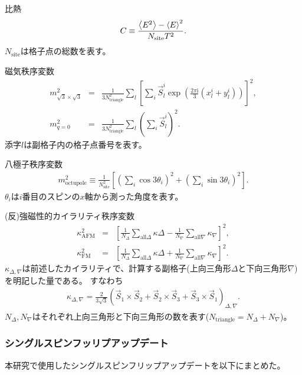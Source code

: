 \documentclass[12pt,titlepage,dvipdfmx]{jarticle}
\begin{document}
比熱
\begin{align}
   C \equiv \frac{\ev{E^2}-\ev{E}^2}{N_{\mathrm{site}}T^2}.
\end{align}
$N_{\mathrm{site}}$は格子点の総数を表す。

磁気秩序変数
\begin{eqnarray}
   m^2_{\mathrm{\sqrt3\times\sqrt3}} &=& 
   \frac{1}{3N^2_{\mathrm{triangle}}}\sum_{l}\left[\sum_{i} \vec S_l^i \exp\left( \frac{2\pi\mathrm{i}}{3}(x_l^i+y_l^i)\right)\right]^2,\\
   m^2_{q=0}                         &=& 
   \frac{1}{3N^2_{\mathrm{triangle}}}\sum_{l}\left(\sum_{i} \vec S_l^i \right)^2.
\end{eqnarray}
添字$l$は副格子内の格子点番号を表す。

八極子秩序変数
\begin{align}
   m^2_{\mathrm{octupole}} \equiv 
\frac{1}{N_{\mathrm{site}}^2}\left[ \left(\sum_i \cos 3\theta_i \right)^2+\left(\sum_i\sin 3\theta_i\right)^2\right].
\end{align}
$\theta_i$は$i$番目のスピンの$x$軸から測った角度を表す。

(反)強磁性的カイラリティ秩序変数
\begin{eqnarray}
   \kappa_{\mathrm{AFM}}^2 &=& 
   \left[ \frac{1}{N_{\Delta}}\sum_{\mathrm{all}\Delta}\kappa{\Delta} - \frac{1}{N_{\nabla}}\sum_{\mathrm{all}\nabla}\kappa_{\nabla}\right]^2,\\
   \kappa_{\mathrm{FM}}^2  &=& 
   \left[ \frac{1}{N_{\Delta}}\sum_{\mathrm{all}\Delta}\kappa{\Delta} + \frac{1}{N_{\nabla}}\sum_{\mathrm{all}\nabla}\kappa_{\nabla}\right]^2.
\end{eqnarray}
$\kappa_{\Delta,\nabla}$は前述したカイラリティで、計算する副格子(上向三角形$\Delta$と下向三角形$\nabla$)を明記した量である。
すなわち
\begin{align}
   \kappa_{\Delta,\nabla} = \frac{2}{3\sqrt{3}}(\vec S_1 \times \vec S_2 + \vec S_2 \times \vec S_3 + \vec S_3 \times \vec S_1)_{\Delta,\nabla}.
\end{align}
$N_{\Delta},N_{\nabla}$はそれぞれ上向三角形と下向三角形の数を表す($N_{\mathrm{triangle}}=N_{\Delta}+N_{\nabla}$)。

\subsubsection{シングルスピンフッリプアップデート}
本研究で使用したシングルスピンフリップアップデートを以下にまとめた。
\end{document}
